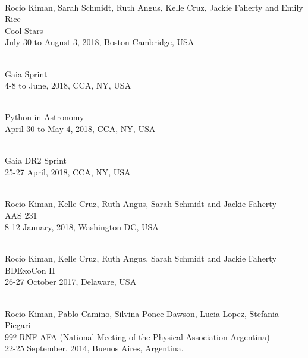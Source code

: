 \documentclass[10pt]{cv}
\begin{document}
\begin{llist}
\begin{etaremune}[leftmargin=10pt]
\item {}\\
Rocio Kiman, Sarah Schmidt, Ruth Angus, Kelle Cruz, Jackie Faherty and Emily Rice\\
Cool Stars \\
July 30 to August 3, 2018, Boston-Cambridge, USA 

\item {}\\
Gaia Sprint \\
4-8 to June, 2018, CCA, NY, USA %

\item {}\\
Python in Astronomy \\
April 30 to May 4, 2018, CCA, NY, USA %

\item {}\\
Gaia DR2 Sprint \\
25-27 April, 2018, CCA, NY, USA %

\item {}\\
Rocio Kiman, Kelle Cruz, Ruth Angus, Sarah Schmidt and Jackie Faherty\\
AAS 231 \\
8-12 January, 2018, Washington DC, USA %

\item {}\\
Rocio Kiman, Kelle Cruz, Ruth Angus, Sarah Schmidt and Jackie Faherty\\ BDExoCon II \\
26-27 October 2017, Delaware, USA %

\item {}\\
Rocio Kiman, Pablo Camino, Silvina Ponce Dawson, Lucia Lopez, Stefania Piegari \\
99º RNF-AFA (National Meeting of the Physical Association Argentina)\\
22-25 September, 2014, Buenos Aires, Argentina.


\end{etaremune}
\end{llist}
\end{document}
